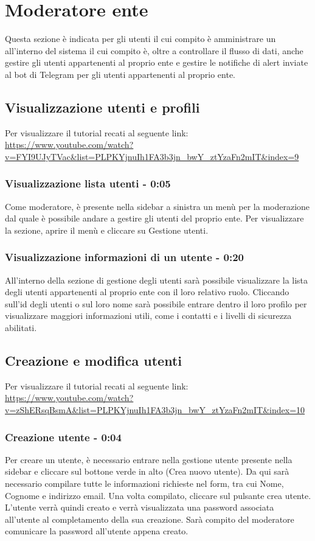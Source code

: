 \section{Moderatore ente}
Questa sezione è indicata per gli utenti il cui compito è amministrare un  all'interno del sistema il cui compito è, oltre a controllare il flusso di dati, anche gestire gli utenti appartenenti al proprio ente e gestire le notifiche di alert inviate al bot di Telegram per gli utenti appartenenti al proprio ente.

\subsection{Visualizzazione utenti e profili}
Per visualizzare il tutorial recati al seguente link: 
\url{https://www.youtube.com/watch?v=FYI9UJyTVac&list=PLPKYjnuIh1FA3b3jn_bwY_ztYzaFn2mIT&index=9}

	\subsubsection{Visualizzazione lista utenti - 0:05}
		Come moderatore, è presente nella sidebar a sinistra un menù per la moderazione dal quale è possibile andare a gestire gli utenti del proprio ente.
		Per visualizzare la sezione, aprire il menù e cliccare su Gestione utenti.

	\subsubsection{Visualizzazione informazioni di un utente - 0:20}
		All'interno della sezione di gestione degli utenti sarà possibile visualizzare la lista degli utenti appartenenti al proprio ente con il loro relativo ruolo.
		Cliccando sull'id degli utenti o sul loro nome sarà possibile entrare dentro il loro profilo per visualizzare maggiori informazioni utili, come i contatti e i livelli di sicurezza abilitati.

\subsection{Creazione e modifica utenti}
Per visualizzare il tutorial recati al seguente link: 
\url{https://www.youtube.com/watch?v=zShERsqBsmA&list=PLPKYjnuIh1FA3b3jn_bwY_ztYzaFn2mIT&index=10}

	\subsubsection{Creazione utente - 0:04}
		Per creare un utente, è necessario entrare nella gestione utente presente nella sidebar e cliccare sul bottone verde in alto (Crea nuovo utente).
		Da qui sarà necessario compilare tutte le informazioni richieste nel form, tra cui Nome, Cognome e indirizzo email.
		Una volta compilato, cliccare sul pulsante crea utente.
		L'utente verrà quindi creato e verrà visualizzata una password associata all'utente al completamento della sua creazione. Sarà compito del moderatore comunicare la password all'utente appena creato.

